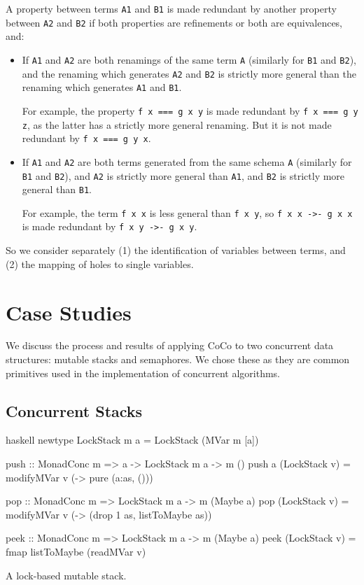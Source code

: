 A property between terms \verb|A1| and \verb|B1| is made redundant by
another property between \verb|A2| and \verb|B2| if both properties
are refinements or both are equivalences, and:

\begin{itemize}
\item If \verb|A1| and \verb|A2| are both renamings of the same term
  \verb|A| (similarly for \verb|B1| and \verb|B2|), and the renaming
  which generates \verb|A2| and \verb|B2| is strictly more general
  than the renaming which generates \verb|A1| and \verb|B1|.

  For example, the property \verb|f x === g x y| is made redundant by
  \verb|f x === g y z|, as the latter has a strictly more general
  renaming.  But it is not made redundant by \verb|f x === g y x|.

\item If \verb|A1| and \verb|A2| are both terms generated from the
  same schema \verb|A| (similarly for \verb|B1| and \verb|B2|), and
  \verb|A2| is strictly more general than \verb|A1|, and \verb|B2| is
  strictly more general than \verb|B1|.

  For example, the term \verb|f x x| is less general than \verb|f x y|,
  so \verb|f x x ->- g x x| is made redundant by
  \verb|f x y ->- g x y|.
\end{itemize}

So we consider separately (1) the identification of variables between
terms, and (2) the mapping of holes to single variables.

\section{Case Studies}
\label{sec:coco-cases}

We discuss the process and results of applying CoCo to two concurrent
data structures: mutable stacks and semaphores.  We chose these as
they are common primitives used in the implementation of concurrent
algorithms.

\subsection{Concurrent Stacks}
\label{sec:coco-cases-stack}

\begin{listing}
\centering
\begin{cminted}{haskell}
newtype LockStack m a = LockStack (MVar m [a])

push :: MonadConc m => a -> LockStack m a -> m ()
push a (LockStack v) = modifyMVar v (\as -> pure (a:as, ()))

pop :: MonadConc m => LockStack m a -> m (Maybe a)
pop (LockStack v) = modifyMVar v (\as -> (drop 1 as, listToMaybe as))

peek :: MonadConc m => LockStack m a -> m (Maybe a)
peek (LockStack v) = fmap listToMaybe (readMVar v)
\end{cminted}
\caption{A lock-based mutable stack.}\label{lst:lockstack}
\end{listing}

